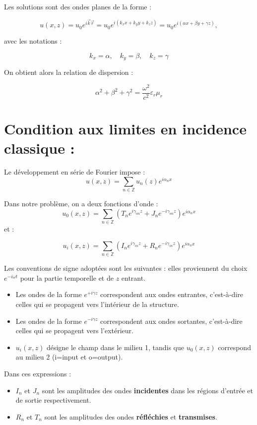 \documentclass{article}
\begin{document}
Les solutions sont des ondes planes de la forme :

\[
u(x, z) = u_0 e^{i \vec{k}  \vec{r}} = u_0 e^{i(k_x x + k_y y + k_z z)} = u_0 e^{i(\alpha x + \beta y + \gamma z)},
\]

avec les notations :

\[
k_x = \alpha, \quad k_y = \beta, \quad k_z = \gamma
\]

On obtient alors la relation de dispersion :

\[
\alpha^2 + \beta^2 + \gamma^2 = \frac{\omega^2}{c^2} \varepsilon_r \mu_r
\]

\section*{Condition aux limites en incidence classique :}

Le développement en série de Fourier impose :
\[
u(x, z) = \sum_{n \in \mathbb{Z}} u_n(z) e^{i \alpha_n x}
\]

Dans notre problème, on a deux fonctions d'onde :
\[
u_0(x, z) = \sum_{n \in \mathbb{Z}} \left( T_n e^{i \gamma_{on} z} + J_n e^{-i \gamma_{on} z} \right) e^{i \alpha_n x}
\]
et :

\[
u_i(x, z) = \sum_{n \in \mathbb{Z}} \left( I_n e^{i \gamma_{in} z} + R_n e^{-i \gamma_{in} z} \right) e^{i \alpha_n x}
\]

Les conventions de signe adoptées sont les suivantes : elles proviennent du choix \(e^{-i\omega t}
\) pour la partie temporelle et de \(z\) entrant.
\begin{itemize}
  \item Les ondes de la forme \( e^{+i \gamma z} \) correspondent aux ondes entrantes, c’est-à-dire celles qui se propagent vers l’intérieur de la structure.
  \item Les ondes de la forme \( e^{-i \gamma z} \) correspondent aux ondes sortantes, c’est-à-dire celles qui se propagent vers l’extérieur.
  \item \( u_i(x,z) \) désigne le champ dans le milieu 1, tandis que \( u_0(x,z) \) correspond au milieu 2 (i=input et o=output).
\end{itemize}

\medskip



Dans ces expressions :
\begin{itemize}
  \item \( I_n \) et \( J_n \) sont les amplitudes des ondes \textbf{incidentes} dans les régions d'entrée et de sortie respectivement.
  \item \( R_n \) et \( T_n \) sont les amplitudes des ondes \textbf{réfléchies} et \textbf{transmises}.
\end{itemize}
\end{document}
